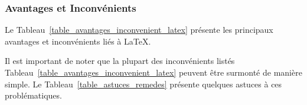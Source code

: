 \documentclass[a4paper,12pt]{report}
\begin{document}
\subsubsection{Avantages et Inconvénients}

Le Tableau~\ref{table_avantages_inconvenient_latex} présente les principaux avantages et inconvénients liés à \LaTeX.

\begin{table}[hbtp]
\caption{Principaux avantages et inconvénients de \LaTeX}
\label{table_avantages_inconvenient_latex}
\end{table}

Il est important de noter que la plupart des inconvénients listés Tableau~\ref{table_avantages_inconvenient_latex} peuvent être surmonté de manière simple. Le Tableau~\ref{table_astuces_remedes} présente quelques astuces à ces problématiques.
\end{document}
